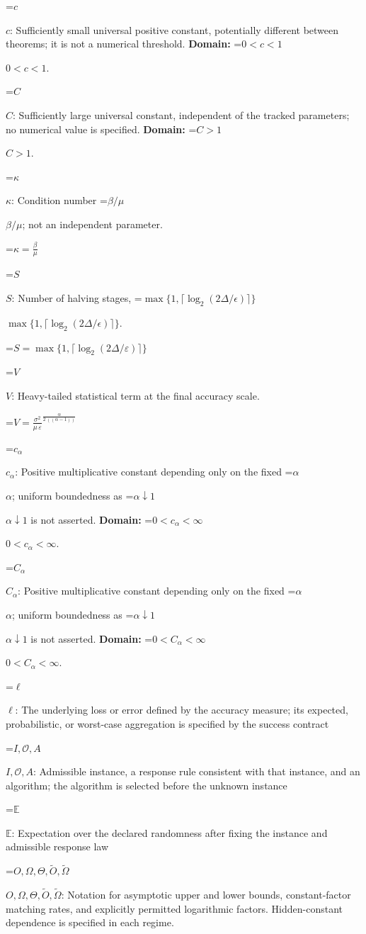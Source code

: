 \documentclass[10pt,a4paper]{article}
\newcommand{\AtlasMath}[1]{\par\begingroup\centering\setbox0=\hbox{$\displaystyle #1$}\ifdim\wd0>1.4\linewidth\typeout{ATLAS WIDE FORMULA: \the\wd0}\fi\ifdim\wd0>\linewidth\resizebox{\linewidth}{!}{\box0}\else\box0\fi\par\endgroup}
\newcommand{\AtlasInlineMath}[1]{\begingroup\setbox0=\hbox{$#1$}\ifdim\wd0>.4\linewidth\endgroup\AtlasMath{#1}\else\endgroup$#1$\fi}
\begin{document}
\AtlasInlineMath{c}: Sufficiently small universal positive constant, potentially different between theorems; it is not a numerical threshold. \textbf{Domain:} \AtlasInlineMath{0<c<1}.

\AtlasInlineMath{C}: Sufficiently large universal constant, independent of the tracked parameters; no numerical value is specified. \textbf{Domain:} \AtlasInlineMath{C>1}.

\AtlasInlineMath{\kappa}: Condition number \AtlasInlineMath{\beta/\mu}; not an independent parameter.


\AtlasMath{\kappa=\frac{\beta}{\mu}}


\AtlasInlineMath{S}: Number of halving stages, \AtlasInlineMath{\max\{1,\lceil\log_2(2\Delta/\epsilon)\rceil\}}.


\AtlasMath{S=\max\{1,\lceil\log_2(2\Delta/\varepsilon)\rceil\}}


\AtlasInlineMath{V}: Heavy-tailed statistical term at the final accuracy scale.


\AtlasMath{V={\frac{{\sigma}^{2}}{\mu\,\varepsilon}}^{\frac{\alpha}{2\,((\alpha-1))}}}


\AtlasInlineMath{c_\alpha}: Positive multiplicative constant depending only on the fixed \AtlasInlineMath{\alpha}; uniform boundedness as \AtlasInlineMath{\alpha\downarrow1} is not asserted. \textbf{Domain:} \AtlasInlineMath{0<c_\alpha<\infty}.

\AtlasInlineMath{C_\alpha}: Positive multiplicative constant depending only on the fixed \AtlasInlineMath{\alpha}; uniform boundedness as \AtlasInlineMath{\alpha\downarrow1} is not asserted. \textbf{Domain:} \AtlasInlineMath{0<C_\alpha<\infty}.

\AtlasInlineMath{\ell}: The underlying loss or error defined by the accuracy measure; its expected, probabilistic, or worst-case aggregation is specified by the success contract

\AtlasInlineMath{I,\mathcal{O},A}: Admissible instance, a response rule consistent with that instance, and an algorithm; the algorithm is selected before the unknown instance

\AtlasInlineMath{\mathbb{E}}: Expectation over the declared randomness after fixing the instance and admissible response law

\AtlasInlineMath{O,\Omega,\Theta,\widetilde{O},\widetilde\Omega}: Notation for asymptotic upper and lower bounds, constant-factor matching rates, and explicitly permitted logarithmic factors. Hidden-constant dependence is specified in each regime.
\end{document}
